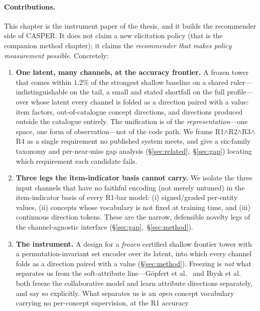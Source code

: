 \documentclass[11pt]{article}
\begin{document}
\paragraph{Contributions.}
This chapter is the instrument paper of the thesis, and it builds the recommender side of CASPER. It does not claim a new elicitation policy (that is the companion
method chapter); it claims the \emph{recommender that makes policy measurement possible}. Concretely:
\begin{enumerate}[leftmargin=1.5em,itemsep=1.5pt]
  \item \textbf{One latent, many channels, at the accuracy frontier.} A frozen tower that comes within $1.2\%$ of the strongest
        shallow baseline on a shared ruler---indistinguishable on the tail, a small and stated shortfall on the full
        profile---over whose latent every channel is folded as a direction paired with a
        value: item factors, out-of-catalogue concept directions, and directions produced outside the catalogue
        entirely. The unification is of the \emph{representation}---one space, one form of observation---not of the
        code path. We frame R1$\wedge$R2$\wedge$R3$\wedge$R4 as a single requirement no published system
        meets, and give a six-family taxonomy and per-near-miss gap analysis
        (\S\ref{sec:related},~\S\ref{sec:gap}) locating which requirement each candidate fails.
  \item \textbf{Three legs the item-indicator basis cannot carry.} We isolate the three input channels that have no faithful encoding
        (not merely untuned) in the item-indicator basis of every R1-bar model: (i) signed/graded per-entity values,
        (ii) concepts whose vocabulary is not fixed at training time, and (iii) continuous direction tokens. These are the narrow, defensible novelty
        legs of the channel-agnostic interface (\S\ref{sec:gap},~\S\ref{sec:method}).
  \item \textbf{The instrument.} A design for a \emph{frozen} certified shallow frontier tower with a
        permutation-invariant set encoder over its latent, into which every channel folds as a
        direction paired with a value (\S\ref{sec:method}). Freezing is \emph{not} what separates us from the
        soft-attribute line---G\"opfert et al.~\cite{gopfert2024cav} and B\i y\i k et al.~\cite{biyik2023soft} both
        freeze the collaborative model and learn attribute directions separately, and say so explicitly. What
        separates us is an \emph{open} concept vocabulary carrying no per-concept supervision, at the R1 accuracy

\end{enumerate}
\end{document}
